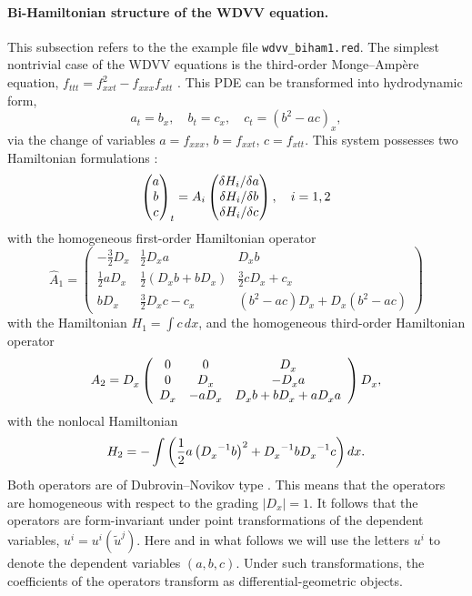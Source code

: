\paragraph*{Bi-Hamiltonian structure of the WDVV equation.}
\label{cdesec:bi-hamilt-struct-1}
This subsection refers to the the example file \texttt{wdvv\_biham1.red}.
The simplest nontrivial case of the WDVV equations is the third-order
Monge--Amp\`ere equation, $f_{ttt} = f_{xxt}^2 - f_{xxx}f_{xtt}$
\cite{Dubrovin:96}. This PDE can be transformed into hydrodynamic form,
\begin{equation*}
  a_t=b_x,\quad b_t=c_x,\quad c_t=(b^2-ac)_x,
\end{equation*}
via the change of variables $a=f_{xxx}$, $b=f_{xxt}$, $c=f_{xtt}$. This system
possesses two Hamiltonian formulations \cite{Ferapontov:97}:
\begin{equation*}
  \begin{pmatrix}
    a \\ b \\ c
  \end{pmatrix}_t =A_i
  \begin{pmatrix}
    \fd{H_i}{a}\\ \fd{H_i}{b} \\ \fd{H_i}{c}
  \end{pmatrix},\quad i=1,2
\end{equation*}
with the homogeneous first-order Hamiltonian operator
\[
\hat{A}_{1}=%
\begin{pmatrix}
-\frac{3}{2}D _{x}^{{}} & \frac{1}{2}D _{x}^{{}}a & D
_{x}^{{}}b \\ 
\frac{1}{2}aD _{x}^{{}} & \frac{1}{2}(D _{x}^{{}}b+bD
_{x}^{{}}) & \frac{3}{2}cD _{x}^{{}}+c_{x} \\ 
bD _{x}^{{}} & \frac{3}{2}D _{x}^{{}}c-c_{x} & 
(b^{2}-ac)D _{x}^{{}}+D _{x}^{{}}(b^{2}-ac)%
\end{pmatrix}
\]%
with the Hamiltonian $H_1 = \int c \, dx$,
and the homogeneous third-order Hamiltonian operator
\[
  A_2= D_x^{}\left(
    \begin{array}{ccc}
      0 & 0 & \displaystyle D_x^{} \\
      0 & \displaystyle D_x^{} & -\displaystyle D_x^{}a \\
      \displaystyle D_x^{} & -a\displaystyle D_x^{} &
      \displaystyle D_x^{}b + bD_x^{} + a D_x^{} a
    \end{array}\right)
  D_x^{},
\]
with the nonlocal Hamiltonian
\[
  H_2=-\int\left(  \frac{1}{2}a\left({D_x^{}}^{-1}b\right)^2 + {D_x^{}}^{-1}b
  {D_x^{}}^{-1}c\right)dx.
\]
Both operators are of Dubrovin--Novikov type \cite{DubrovinNovikov:83,DubrovinNovikov:84}. 
This means that the
operators are homogeneous with respect to the grading $|D_x|=1$. It follows
that the operators are form-invariant under point transformations of the
dependent variables, $u^i=u^i(\tilde u^j)$. Here and in what follows we will
use the letters $u^i$ to denote the dependent variables $(a,b,c)$. Under such
transformations, the coefficients of the operators transform as
differential-geometric objects.

